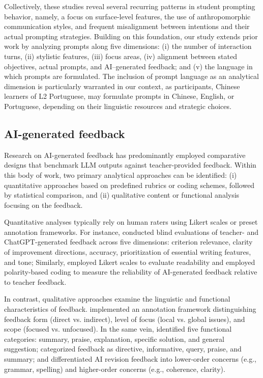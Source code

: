 \documentclass[english]{textolivre}
\begin{document}
Collectively, these studies reveal several recurring patterns in student prompting behavior, namely, a focus on surface-level features, the use of anthropomorphic communication styles, and frequent misalignment between intentions and their actual prompting strategies. Building on this foundation, our study extends prior work by analyzing prompts along five dimensions: (i) the number of interaction turns, (ii) stylistic features, (iii) focus areas, (iv) alignment between stated objectives, actual prompts, and AI--generated feedback; and (v) the language in which prompts are formulated. The inclusion of prompt language as an analytical dimension is particularly warranted in our context, as participants, Chinese learners of L2 Portuguese, may formulate prompts in Chinese, English, or Portuguese, depending on their linguistic resources and strategic choices. 


\subsection{AI-generated feedback}

Research on AI-generated feedback has predominantly employed comparative designs that benchmark LLM outputs against teacher-provided feedback. Within this body of work, two primary analytical approaches can be identified: (i) quantitative approaches based on predefined rubrics or coding schemes, followed by statistical comparison, and (ii) qualitative content or functional analysis focusing on the feedback.


Quantitative analyses typically rely on human raters using Likert scales or preset annotation frameworks. For instance, \textcite{STEISS2024} conducted blind evaluations of teacher- and ChatGPT-generated feedback across five dimensions: criterion relevance, clarity of improvement directions, accuracy, prioritization of essential writing features, and tone; Similarly, \textcite{DAI2024100299} employed Likert scales to evaluate readability and employed polarity-based coding to measure the reliability of AI-generated feedback relative to teacher feedback.


In contrast, qualitative approaches examine the linguistic and functional characteristics of feedback. \textcite{lin2024grass} implemented an annotation framework distinguishing feedback form (direct vs. indirect), level of focus (local vs. global issues), and scope (focused vs. unfocused). In the same vein, \textcite{Lu2024} identified five functional categories: summary, praise, explanation, specific solution, and general suggestion; \textcite{guo2023resist} categorized feedback as directive, informative, query, praise, and summary; and \textcite{KOLTOVSKAIA2024} differentiated AI revision feedback into lower-order concerns (e.g., grammar, spelling) and higher-order concerns (e.g., coherence, clarity).
\end{document}
